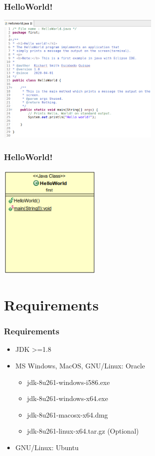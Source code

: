 \documentclass[11pt]{beamer}
\begin{document}
\begin{frame}
\frametitle{HelloWorld!}
\begin{center}
{\includegraphics[width=8.0cm]{img/HelloWorld.java.png}}
\end{center}
\end{frame}

\begin{frame}
\frametitle{HelloWorld!}
\begin{center}
{\includegraphics[width=5.0cm]{img/HelloWorld.Java.Class.png}}
\end{center}
\end{frame}



\section{Requirements}
\begin{frame}
\frametitle{Requirements}
\begin{itemize}
\item JDK >=1.8
\item MS Windows, MacOS, GNU/Linux: Oracle
\begin{itemize}
\item jdk-8u261-windows-i586.exe
\item jdk-8u261-windows-x64.exe
\item jdk-8u261-macosx-x64.dmg
\item jdk-8u261-linux-x64.tar.gz (Optional)
\end{itemize}
\item GNU/Linux: Ubuntu 
\end{itemize}

\end{frame}
\end{document}
